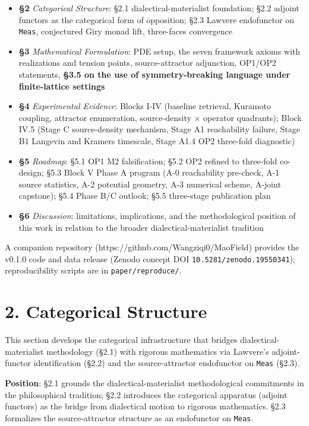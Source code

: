 \documentclass[
]{article}
\providecommand{\tightlist}{%
  \setlength{\itemsep}{0pt}\setlength{\parskip}{0pt}}
\begin{document}
\begin{itemize}
\tightlist
\item
  \textbf{§2} \emph{Categorical Structure}: §2.1 dialectical-materialist
  foundation; §2.2 adjoint functors as the categorical form of
  opposition; §2.3 Lawvere endofunctor on \texttt{Meas}, conjectured
  Giry monad lift, three-faces convergence
\item
  \textbf{§3} \emph{Mathematical Formulation}: PDE setup, the seven
  framework axioms with realizations and tension points,
  source-attractor adjunction, OP1/OP2 statements, \textbf{§3.5 on the
  use of symmetry-breaking language under finite-lattice settings}
\item
  \textbf{§4} \emph{Experimental Evidence}: Blocks I-IV (baseline
  retrieval, Kuramoto coupling, attractor enumeration, source-density ×
  operator quadrants); Block IV.5 (Stage C source-density mechanism,
  Stage A1 reachability failure, Stage B1 Langevin and Kramers
  timescale, Stage A1.4 OP2 three-fold diagnostic)
\item
  \textbf{§5} \emph{Roadmap}: §5.1 OP1 M2 falsification; §5.2 OP2
  refined to three-fold co-design; §5.3 Block V Phase A program (A-0
  reachability pre-check, A-1 source statistics, A-2 potential geometry,
  A-3 numerical scheme, A-joint capstone); §5.4 Phase B/C outlook; §5.5
  three-stage publication plan
\item
  \textbf{§6} \emph{Discussion}: limitations, implications, and the
  methodological position of this work in relation to the broader
  dialectical-materialist tradition
\end{itemize}

A companion repository (https://github.com/Wangziqi0/MaoField) provides
the v0.1.0 code and data release (Zenodo concept DOI
\texttt{10.5281/zenodo.19550341}); reproducibility scripts are in
\texttt{paper/reproduce/}.

\hypertarget{categorical-structure}{%
\section{2. Categorical Structure}\label{categorical-structure}}

This section develops the categorical infrastructure that bridges
dialectical-materialist methodology (§2.1) with rigorous mathematics via
Lawvere's adjoint-functor identification (§2.2) and the source-attractor
endofunctor on \texttt{Meas} (§2.3).

\textbf{Position}: §2.1 grounds the dialectical-materialist
methodological commitments in the philosophical tradition; §2.2
introduces the categorical apparatus (adjoint functors) as the bridge
from dialectical motion to rigorous mathematics. §2.3 formalizes the
source-attractor structure as an endofunctor on \texttt{Meas}.
\end{document}

